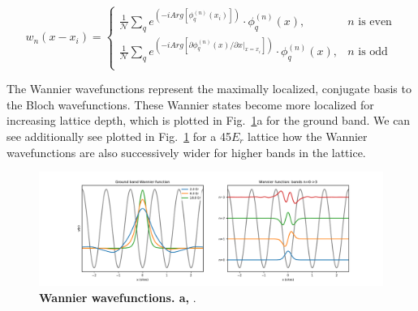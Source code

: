 \begin{equation}
\label{eqn:wFx}
w_n(x-x_i) = \left \{
\begin{array}{ll}
     \frac{1}{\mathcal{N}} \sum_q  e^{\left (  - i Arg [ \phi_q^{(n)} (x_i) ] \right )} \cdot \phi_q^{(n)} (x), & n\mathrm{\text{ is even}}\\
      \frac{1}{\mathcal{N}} \sum_q  e^{\left (  - i Arg [ \partial \phi_q^{(n)} (x)/ \partial x |_{x=x_i} ] \right )} \cdot \phi_q^{(n)} (x), & n \mathrm{\text{ is odd}}\\
\end{array} 
\right .
\end{equation}

The Wannier wavefunctions represent the maximally localized, conjugate basis to the Bloch wavefunctions. These Wannier states become more localized for increasing lattice depth, which is plotted in Fig.~\ref{fig:wFx}a for the ground band. We can see additionally see plotted in Fig.~\ref{fig:wFx} for a 45$E_r$ lattice how the Wannier wavefunctions are also successively wider for higher bands in the lattice. 

\begin{figure}[ht!]
		\includegraphics[width=\columnwidth]{figures/ch1/BHParams/WannierFx.pdf} 
		\caption{\textbf{Wannier wavefunctions. a,}  .}
		\label{fig:wFx}	
\end{figure}

